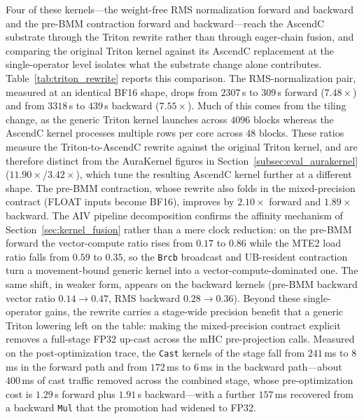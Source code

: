 Four of these kernels---the weight-free RMS normalization forward and backward and the pre-BMM contraction forward and backward---reach the AscendC substrate through the Triton rewrite rather than through eager-chain fusion, and comparing the original Triton kernel against its AscendC replacement at the single-operator level isolates what the substrate change alone contributes. Table~\ref{tab:triton_rewrite} reports this comparison. The RMS-normalization pair, measured at an identical BF16 shape, drops from $2307$\,\textmu s to $309$\,\textmu s forward ($7.48\times$) and from $3318$\,\textmu s to $439$\,\textmu s backward ($7.55\times$). Much of this comes from the tiling change, as the generic Triton kernel launches across $4096$ blocks whereas the AscendC kernel processes multiple rows per core across $48$ blocks. These ratios measure the Triton-to-AscendC rewrite against the original Triton kernel, and are therefore distinct from the AuraKernel figures in Section~\ref{subsec:eval_aurakernel} ($11.90\times$/$3.42\times$), which tune the resulting AscendC kernel further at a different shape. The pre-BMM contraction, whose rewrite also folds in the mixed-precision contract (FLOAT inputs become BF16), improves by $2.10\times$ forward and $1.89\times$ backward. The AIV pipeline decomposition confirms the affinity mechanism of Section~\ref{sec:kernel_fusion} rather than a mere clock reduction: on the pre-BMM forward the vector-compute ratio rises from $0.17$ to $0.86$ while the MTE2 load ratio falls from $0.59$ to $0.35$, so the \texttt{Brcb} broadcast and UB-resident contraction turn a movement-bound generic kernel into a vector-compute-dominated one. The same shift, in weaker form, appears on the backward kernels (pre-BMM backward vector ratio $0.14\rightarrow0.47$, RMS backward $0.28\rightarrow0.36$). Beyond these single-operator gains, the rewrite carries a stage-wide precision benefit that a generic Triton lowering left on the table: making the mixed-precision contract explicit removes a full-stage FP32 up-cast across the mHC pre-projection calls. Measured on the post-optimization trace, the \texttt{Cast} kernels of the stage fall from $241$\,ms to $8$\,ms in the forward path and from $172$\,ms to $6$\,ms in the backward path---about $400$\,ms of cast traffic removed across the combined stage, whose pre-optimization cost is $1.29$\,s forward plus $1.91$\,s backward---with a further $157$\,ms recovered from a backward \texttt{Mul} that the promotion had widened to FP32.

